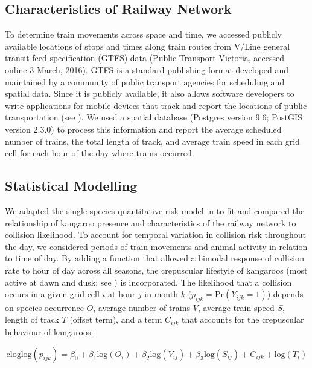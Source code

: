 \subsection{Characteristics of Railway Network}

To determine train movements across space and time, we accessed publicly available locations of stops and times along train routes from V/Line general transit feed specification (GTFS) data (Public Transport Victoria, accessed online 3 March, 2016).  GTFS is a standard publishing format developed and maintained by a community of public transport agencies for scheduling and spatial data.  Since it is publicly available, it also allows software developers to write applications for mobile devices that track and report the locations of public transportation (see \cite{hill11}).  We used a spatial database (Postgres version 9.6; PostGIS version 2.3.0) to process this information and report the average scheduled number of trains, the total length of track, and average train speed in each grid cell for each hour of the day where trains occurred.

\subsection{Statistical Modelling}

We adapted the single-species quantitative risk model in  to fit and compared the relationship of kangaroo presence and characteristics of the railway network to collision likelihood. To account for temporal variation in collision risk throughout the day, we considered periods of train movements and animal activity in relation to time of day. By adding a function that allowed a bimodal response of collision rate to hour of day across all seasons, the crepuscular lifestyle of kangaroos (most active at dawn and dusk; see \cite{daws12}) is incorporated. The likelihood that a collision occurs in a given grid cell $i$ at hour $j$ in month $k$ ($p_{ijk} = \text{Pr}(Y_{ijk}=1)$) depends on species occurrence $O$, average number of trains $V$, average train speed $S$, length of track $T$ (offset term), and a term $C_{ijk}$ that accounts for the crepuscular behaviour of kangaroos:

\begin{equation} \label{eq:51}
\text{cloglog}(p_{ijk})=\beta_0+\beta_1\text{log}(O_i)+\beta_2\text{log}(V_{ij})+\beta_3\text{log}(S_{ij}) + C_{ijk} + \text{log}(T_i)
\end{equation}

